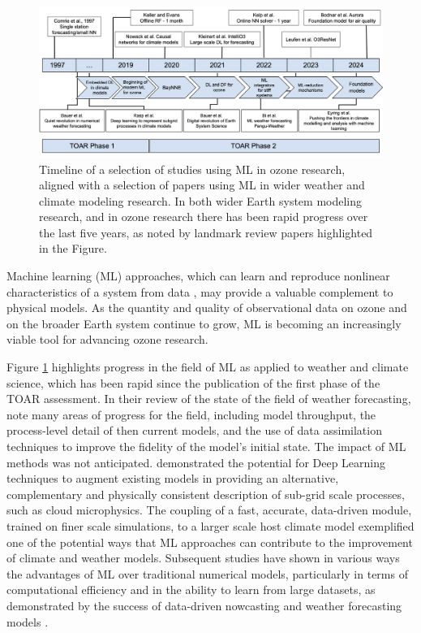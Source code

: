 \documentclass[gmd, manuscript]{copernicus}
\begin{document}
\begin{figure}
    \centering
    \includegraphics[width=0.9\linewidth]{figures/In progress ML4O3.png} 
    \caption{Timeline of a selection of studies using ML in ozone research, aligned with a selection of papers using ML in wider weather and climate modeling research. In both wider Earth system modeling research, and in ozone research there has been rapid progress over the last five years, as noted by landmark review papers highlighted in the Figure.}
    \label{fig:timeline}
\end{figure}

Machine learning (ML) approaches, which can learn and reproduce nonlinear characteristics of a system from data \citep{hornik_multilayer_1989}, may provide a valuable complement to physical models. As the quantity and quality of observational data on ozone \citep{Schultz2017} and on the broader Earth system \citep{doi:10.1080/17538947.2016.1250829,reichstein_deep_2019} continue to grow, ML is becoming an increasingly viable tool for advancing ozone research. 

Figure \ref{fig:timeline} highlights progress in the field of ML as applied to weather and climate science, which has been rapid since the publication of the first phase of the TOAR assessment.  In their review of the state of the field of weather forecasting, \citet{bauer_quiet_2015} note many areas of progress for the field, including model throughput, the process-level detail of then current models, and the use of data assimilation techniques to improve the fidelity of the model's initial state. The impact of ML methods was not anticipated.  
\citet{rasp_deep_2018} demonstrated the potential for Deep Learning techniques to augment existing models in providing an alternative, complementary and physically consistent description of sub-grid scale processes, such as cloud microphysics.  The coupling of a fast, accurate, data-driven module, trained on finer scale simulations, to a larger scale host climate model exemplified one of the potential ways that ML approaches can contribute to the improvement of climate and weather models.  
Subsequent studies have shown in various ways the advantages of ML over traditional numerical models, particularly in terms of computational efficiency and in the ability to learn from large datasets, as demonstrated by the success of data-driven nowcasting and weather forecasting models \citep{bi_accurate_2023, lam_learning_2023, price_gencast_2024}.  
\end{document}
